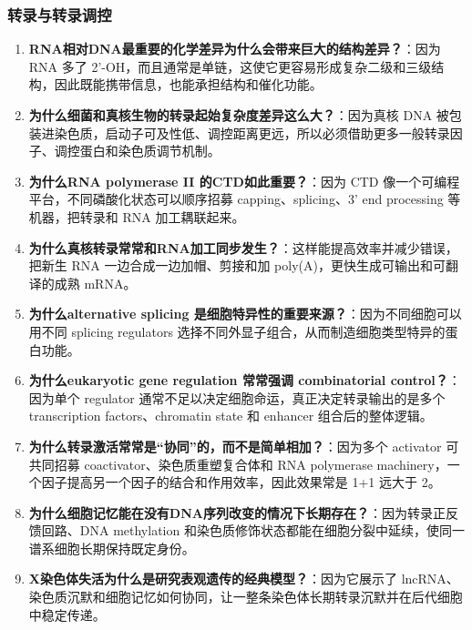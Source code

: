 \documentclass[12pt,fontset=none]{ctexart}
\begin{document}
\subsubsection*{转录与转录调控}
\begin{enumerate}
\item \textbf{RNA相对DNA最重要的化学差异为什么会带来巨大的结构差异？}：因为 RNA 多了 2'-OH，而且通常是单链，这使它更容易形成复杂二级和三级结构，因此既能携带信息，也能承担结构和催化功能。

\item \textbf{为什么细菌和真核生物的转录起始复杂度差异这么大？}：因为真核 DNA 被包装进染色质，启动子可及性低、调控距离更远，所以必须借助更多一般转录因子、调控蛋白和染色质调节机制。

\item \textbf{为什么RNA polymerase II 的CTD如此重要？}：因为 CTD 像一个可编程平台，不同磷酸化状态可以顺序招募 capping、splicing、3' end processing 等机器，把转录和 RNA 加工耦联起来。

\item \textbf{为什么真核转录常常和RNA加工同步发生？}：这样能提高效率并减少错误，把新生 RNA 一边合成一边加帽、剪接和加 poly(A)，更快生成可输出和可翻译的成熟 mRNA。

\item \textbf{为什么alternative splicing 是细胞特异性的重要来源？}：因为不同细胞可以用不同 splicing regulators 选择不同外显子组合，从而制造细胞类型特异的蛋白功能。

\item \textbf{为什么eukaryotic gene regulation 常常强调 combinatorial control？}：因为单个 regulator 通常不足以决定细胞命运，真正决定转录输出的是多个 transcription factors、chromatin state 和 enhancer 组合后的整体逻辑。

\item \textbf{为什么转录激活常常是“协同”的，而不是简单相加？}：因为多个 activator 可共同招募 coactivator、染色质重塑复合体和 RNA polymerase machinery，一个因子提高另一个因子的结合和作用效率，因此效果常是 1+1 远大于 2。

\item \textbf{为什么细胞记忆能在没有DNA序列改变的情况下长期存在？}：因为转录正反馈回路、DNA methylation 和染色质修饰状态都能在细胞分裂中延续，使同一谱系细胞长期保持既定身份。

\item \textbf{X染色体失活为什么是研究表观遗传的经典模型？}：因为它展示了 lncRNA、染色质沉默和细胞记忆如何协同，让一整条染色体长期转录沉默并在后代细胞中稳定传递。

\end{enumerate}
\end{document}
